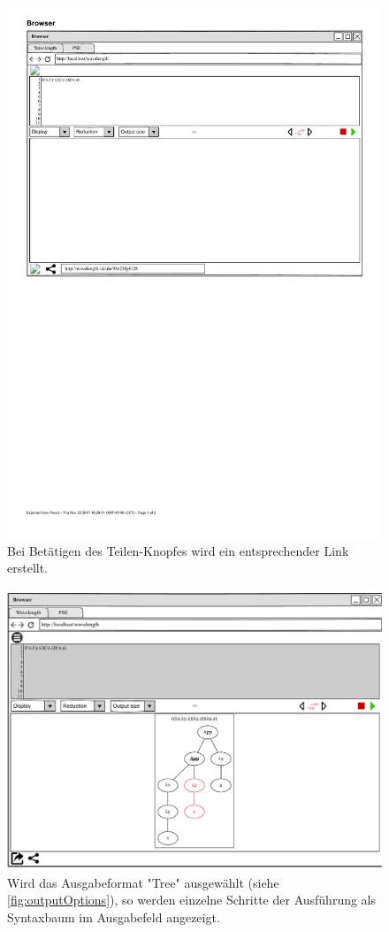 \documentclass[parskip=full,11pt,twoside]{scrartcl}
\begin{document}
\begin{figure}[H]
	\centering
	\includegraphics{img/share}
	\caption{Bei Betätigen des Teilen-Knopfes wird ein entsprechender Link erstellt.}
	\label{img:share}
\end{figure}


\begin{figure}[H]
	\centering
	\includegraphics[width=\textwidth]{img/displayTree1}
	\caption{\label{fig:tree}Wird das Ausgabeformat "Tree" ausgewählt (siehe \cref{fig:outputOptions}), so werden einzelne Schritte der Ausführung als Syntaxbaum im Ausgabefeld angezeigt.}
\end{figure}
\end{document}
